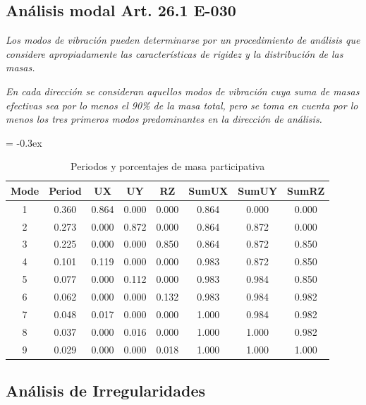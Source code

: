 \documentclass{article}%
\begin{document}
\subsection{Análisis modal Art. 26.1 E-030}%
\label{subsec:AnlisismodalArt.26.1E{-}030}%
\begin{tcolorbox}[colback=gray!5!white,colframe=Maroon!75!black,fonttitle=\bfseries,title=Art. 26.1.1]%
\textit{Los modos de vibración pueden determinarse por un procedimiento de análisis que considere apropiadamente las características de rigidez y la distribución de las masas.}%
\end{tcolorbox}%
\begin{tcolorbox}[colback=gray!5!white,colframe=Maroon!75!black,fonttitle=\bfseries,title=Art. 29.1.2]%
\textit{En cada dirección se consideran aquellos modos de vibración cuya suma de masas efectivas sea por lo menos el 90\% de la masa total, pero se toma en cuenta por lo menos los tres primeros modos predominantes en la dirección de análisis.}%
\end{tcolorbox}%


\begin{table}[h!]%
\extrarowheight = -0.3ex%
\renewcommand{\arraystretch}{1.3}%
\centering%
\caption{Periodos y porcentajes de masa participativa}%
\begin{tabular}{cccccccc}
\toprule
Mode & Period & UX & UY & RZ & SumUX & SumUY & SumRZ \\
\midrule
1 & 0.360 & 0.864 & 0.000 & 0.000 & 0.864 & 0.000 & 0.000 \\
2 & 0.273 & 0.000 & 0.872 & 0.000 & 0.864 & 0.872 & 0.000 \\
3 & 0.225 & 0.000 & 0.000 & 0.850 & 0.864 & 0.872 & 0.850 \\
4 & 0.101 & 0.119 & 0.000 & 0.000 & 0.983 & 0.872 & 0.850 \\
5 & 0.077 & 0.000 & 0.112 & 0.000 & 0.983 & 0.984 & 0.850 \\
6 & 0.062 & 0.000 & 0.000 & 0.132 & 0.983 & 0.984 & 0.982 \\
7 & 0.048 & 0.017 & 0.000 & 0.000 & 1.000 & 0.984 & 0.982 \\
8 & 0.037 & 0.000 & 0.016 & 0.000 & 1.000 & 1.000 & 0.982 \\
9 & 0.029 & 0.000 & 0.000 & 0.018 & 1.000 & 1.000 & 1.000 \\
\bottomrule
\end{tabular}
%
\end{table}

%
\subsection{Análisis de Irregularidades}%
\label{subsec:AnlisisdeIrregularidades}%
\end{document}
